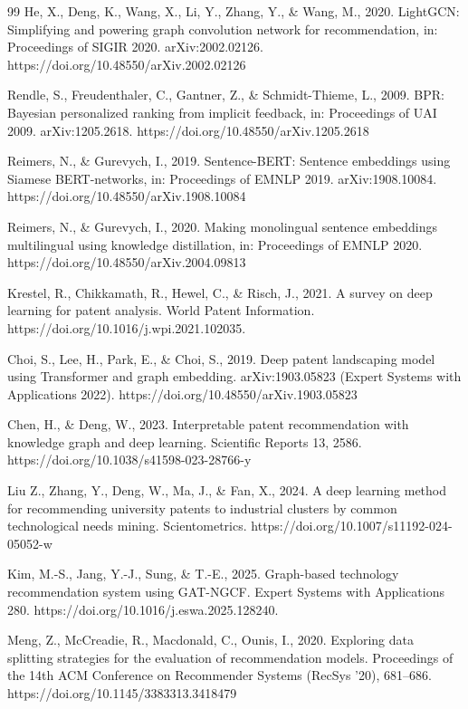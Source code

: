 \documentclass[preprint,12pt]{elsarticle}
\begin{document}
\begin{thebibliography}{99}
He, X., Deng, K., Wang, X., Li, Y., Zhang, Y., \& Wang, M., 2020. LightGCN: Simplifying and powering graph convolution network for recommendation, in: Proceedings of SIGIR 2020. arXiv:2002.02126. https://doi.org/10.48550/arXiv.2002.02126

Rendle, S., Freudenthaler, C., Gantner, Z., \& Schmidt-Thieme, L., 2009. BPR: Bayesian personalized ranking from implicit feedback, in: Proceedings of UAI 2009. arXiv:1205.2618. https://doi.org/10.48550/arXiv.1205.2618

Reimers, N., \& Gurevych, I., 2019. Sentence-BERT: Sentence embeddings using Siamese BERT-networks, in: Proceedings of EMNLP 2019. arXiv:1908.10084. https://doi.org/10.48550/arXiv.1908.10084

Reimers, N., \& Gurevych, I., 2020. Making monolingual sentence embeddings multilingual using knowledge distillation, in: Proceedings of EMNLP 2020. https://doi.org/10.48550/arXiv.2004.09813

Krestel, R., Chikkamath, R., Hewel, C., \& Risch, J., 2021. A survey on deep learning for patent analysis. World Patent Information. https://doi.org/10.1016/j.wpi.2021.102035.

Choi, S., Lee, H., Park, E., \& Choi, S., 2019. Deep patent landscaping model using Transformer and graph embedding. arXiv:1903.05823 (Expert Systems with Applications 2022). https://doi.org/10.48550/arXiv.1903.05823

Chen, H., \& Deng, W., 2023. Interpretable patent recommendation with knowledge graph and deep learning. Scientific Reports 13, 2586. https://doi.org/10.1038/s41598-023-28766-y

Liu Z., Zhang, Y., Deng, W., Ma, J., \& Fan, X., 2024. A deep learning method for recommending university patents to industrial clusters by common technological needs mining. Scientometrics. https://doi.org/10.1007/s11192-024-05052-w

Kim, M.-S., Jang, Y.-J., Sung, \& T.-E., 2025. Graph-based technology recommendation system using GAT-NGCF. Expert Systems with Applications 280. https://doi.org/10.1016/j.eswa.2025.128240.

Meng, Z., McCreadie, R., Macdonald, C., Ounis, I., 2020. Exploring data splitting strategies for the evaluation of recommendation models. Proceedings of the 14th ACM Conference on Recommender Systems (RecSys '20), 681–686. https://doi.org/10.1145/3383313.3418479


\end{thebibliography}
\end{document}
